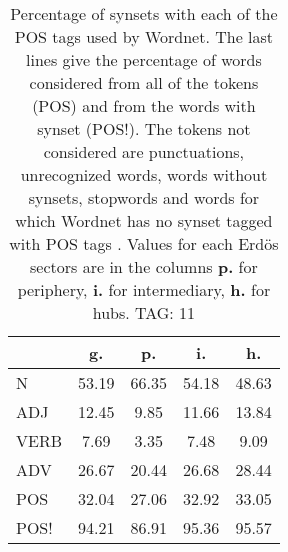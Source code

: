 \begin{table}[h!]
\begin{center}
\begin{tabular}{| l || c | c | c | c |}\hline
 & {\bf g.} & {\bf p.} & {\bf i.} & {\bf h.} \\\hline\hline
N & 53.19  & 66.35  & 54.18  & 48.63 \\\hline
ADJ & 12.45  & 9.85  & 11.66  & 13.84 \\\hline
VERB & 7.69  & 3.35  & 7.48  & 9.09 \\\hline
ADV & 26.67  & 20.44  & 26.68  & 28.44 \\\hline\hline
POS & 32.04  & 27.06  & 32.92  & 33.05 \\\hline
POS! & 94.21  & 86.91  & 95.36  & 95.57 \\\hline
\end{tabular}
\caption{Percentage of synsets with each of the POS tags used by Wordnet. The last lines give the percentage of words considered from all of the tokens (POS) and from the words with synset (POS!). The tokens not considered are punctuations, unrecognized words, words without synsets, stopwords and words for which Wordnet has no synset  tagged with POS tags . Values for each Erd\"os sectors are in the columns {{\bf p.}} for periphery, {{\bf i.}} for intermediary, {{\bf h.}} for hubs. TAG: 11}
\end{center}
\end{table}